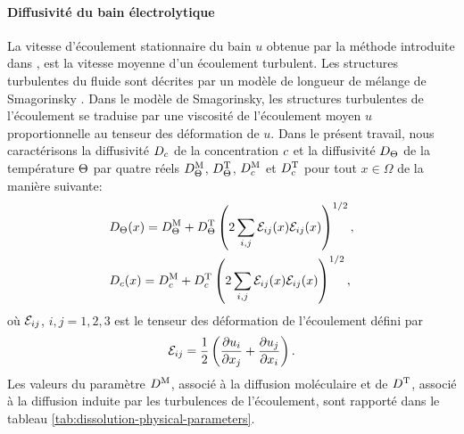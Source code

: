 \paragraph{Diffusivité du bain électrolytique} La vitesse d'écoulement
stationnaire du bain $u$ obtenue par la méthode introduite dans
\cite{Steiner2009}, \cite{Rochat2016} est la vitesse moyenne d'un
écoulement turbulent. Les structures turbulentes du fluide sont
décrites par un modèle de longueur de mélange de Smagorinsky
\cite{Rochat2016}. Dans le modèle de Smagorinsky, les structures
turbulentes de l'écoulement se traduise par une viscosité de
l'écoulement moyen $u$ proportionnelle au tenseur des déformation de
$u$. Dans le présent travail, nous caractérisons la diffusivité
$D_{c}$ de la concentration $c$ et la
diffusivité $D_\Theta$ de la température $\Theta$ par
quatre réels $D^{\mathrm M}_\Theta$, $D^{\mathrm T}_\Theta$,
$D^{\mathrm M}_c$ et $D^{\mathrm T}_c$ pour tout
$x\in\Omega$ de la manière suivante:
\begin{align}
  &D_\Theta(x) = D^{\mathrm M}_\Theta +
  D^{\mathrm T}_\Theta\left( 2\sum_{i,j}\mathcal E_{ij}(x)\mathcal E_{ij}(x) \right)^{1/2},\\
  &D_{c}(x) = D^{\mathrm M}_c +
  D^{\mathrm T}_c\left( 2\sum_{i,j}\mathcal E_{ij}(x)\mathcal E_{ij}(x) \right)^{1/2},
\end{align}
où $\mathcal E_{ij}$, $i, j = 1,2,3$ est le tenseur des déformation
de l'écoulement défini par
\begin{equation}
  \mathcal E_{ij} = \frac{1}{2}\left( \frac{\partial u_i}{\partial
      x_j} + \frac{\partial u_j}{\partial x_i} \right).
\end{equation}
Les valeurs du paramètre $D^{\mathrm M}$, associé à la diffusion
moléculaire et de $D^{\mathrm T}$, associé à la diffusion
induite par les turbulences de l'écoulement, sont rapporté dans le
tableau \ref{tab:dissolution-physical-parameters}.


